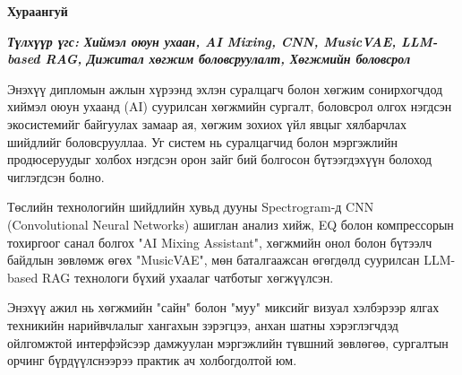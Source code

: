 

\begin{center}
{\scshape\Large \univname\par} %
{\scshape\large \facname\par}\vspace{0.5cm} %
{\huge\textbf{{Хураангуй}} \par}
\bigskip
{\Large{\ttitle} \par} %
\bigskip

{\normalsize \shortname \par} %
\addressname
\end{center}

\textit{\textbf{Түлхүүр үгс: Хиймэл оюун ухаан, AI Mixing, CNN, MusicVAE, LLM-based RAG, Дижитал хөгжим боловсруулалт, Хөгжмийн боловсрол}}
\bigskip

Энэхүү дипломын ажлын хүрээнд эхлэн суралцагч болон хөгжим сонирхогчдод хиймэл оюун ухаанд (AI) суурилсан хөгжмийн сургалт, боловсрол олгох нэгдсэн экосистемийг байгуулах замаар ая, хөгжим зохиох үйл явцыг хялбарчлах шийдлийг боловсрууллаа. Уг систем нь суралцагчид болон мэргэжлийн продюсеруудыг холбох нэгдсэн орон зайг бий болгосон бүтээгдэхүүн болоход чиглэгдсэн болно.

Төслийн технологийн шийдлийн хувьд дууны Spectrogram-д CNN (Convolutional Neural Networks) ашиглан анализ хийж, EQ болон компрессорын тохиргоог санал болгох "AI Mixing Assistant", хөгжмийн онол болон бүтээлч байдлын зөвлөмж өгөх "MusicVAE", мөн баталгаажсан өгөгдөлд суурилсан LLM-based RAG технологи бүхий ухаалаг чатботыг хөгжүүлсэн. 

Энэхүү ажил нь хөгжмийн "сайн" болон "муу" миксийг визуал хэлбэрээр ялгах техникийн нарийвчлалыг хангахын зэрэгцээ, анхан шатны хэрэглэгчдэд ойлгомжтой интерфэйсээр дамжуулан мэргэжлийн түвшний зөвлөгөө, сургалтын орчинг бүрдүүлснээрээ практик ач холбогдолтой юм.

